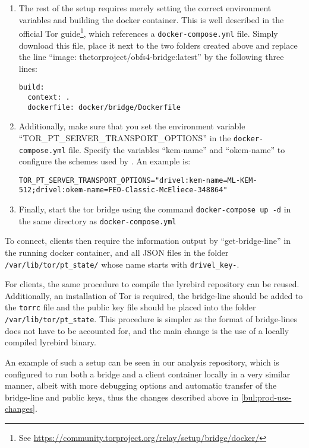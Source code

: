 \begin{enumerate}
    \item The rest of the setup requires merely setting the correct environment variables and building the docker container. This is well described in the official Tor guide\footnote{See \url{https://community.torproject.org/relay/setup/bridge/docker/}}, which references a \texttt{docker-compose.yml} file. Simply download this file, place it next to the two folders created above and replace the line ``image: thetorproject/obfs4-bridge:latest'' by the following three lines:
    \begin{lstlisting}
build:
  context: .
  dockerfile: docker/bridge/Dockerfile
    \end{lstlisting}

    \item Additionally, make sure that you set the environment variable ``TOR\_PT\_SERVER\_TRANSPORT\_OPTIONS'' in the \texttt{docker-compose.yml} file. Specify the variables ``kem-name'' and ``okem-name'' to configure the schemes used by \drivel{}. An example is:
    \begin{lstlisting}
TOR_PT_SERVER_TRANSPORT_OPTIONS="drivel:kem-name=ML-KEM-512;drivel:okem-name=FEO-Classic-McEliece-348864"
    \end{lstlisting}

    \item Finally, start the tor bridge using the command \texttt{docker-compose up -d} in the same directory as \texttt{docker-compose.yml}
\end{enumerate}

To connect, clients then require the information output by ``get-bridge-line'' in the running docker container, and all JSON files in the folder \texttt{/var/lib/tor/pt\_state/} whose name starts with \texttt{drivel\_key-}.

For clients, the same procedure to compile the lyrebird repository can be reused. Additionally, an installation of Tor is required, the bridge-line should be added to the \texttt{torrc} file and the public key file should be placed into the folder \texttt{/var/lib/tor/pt\_state}. This procedure is simpler as the format of bridge-lines does not have to be accounted for, and the main change is the use of a locally compiled lyrebird binary.

An example of such a setup can be seen in our analysis repository, which is configured to run both a bridge and a client container locally in a very similar manner, albeit with more debugging options and automatic transfer of the bridge-line and public keys, thus the changes described above in \cref{bul:prod-use-changes}.

